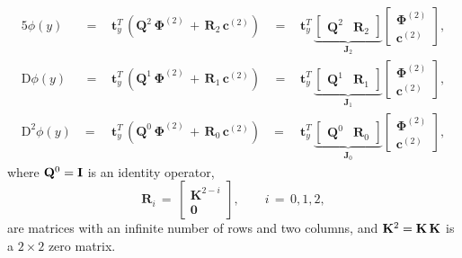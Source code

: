 \documentclass[%
secnumarabic,%
 amssymb, amsmath,%
 aps,prf,superscriptaddress,longbibliography
frontmatterverbose,
]{revtex4-2}
\begin{document}
\begin{alignat}{5}
  \phi(y) 
   &~\,= ~\,& 
   \mathbf t_y^T \, ( \mathbf Q^2 \, \mathbf \Phi^{(2)} \, + \, \mathbf R_2 \, \mathbf c^{(2)} )
   &~\,= ~\,& 	
   \mathbf t_y^T  
   \, 
   \underbrace{\left[\begin{array}{cc} \mathbf Q^2 &  \mathbf R_2 \end{array}\right]}_{\mathbf{J}_2}\left[\begin{array}{c}\boldsymbol \Phi^{(2)} \\ \mathbf c^{(2)}  \end{array}\right],
   \label{eq:rndu}
	\\
	\mathrm D \phi (y) 
  &~\,= ~\,&  
  \mathbf t_y^T \, ( \mathbf Q^1 \, \mathbf \Phi^{(2)} \,+ \, \mathbf R_1 \, \mathbf c^{(2)} )
  &~\,= ~\,& 
  \mathbf t_y^T \, \underbrace{\left[\begin{array}{cc} \mathbf Q^1 &  \mathbf R_1 \end{array}\right]}_{\mathbf J_1}\left[\begin{array}{c}\mathbf \Phi^{(2)} \\ \mathbf c^{(2)}  \end{array}\right],
	\label{eq:rndDu}
	\\
	\mathrm D^2 \phi (y) 
  &\;=\;& 
  \mathbf t_y^T \, ( \mathbf Q^0 \, \mathbf \Phi^{(2)} \,+ \, \mathbf R_0 \, \mathbf c^{(2)} )
  &\; = \;& 
  \mathbf t_y^T \, \underbrace{\left[\begin{array}{cc} \mathbf Q^0 &  \mathbf R_0 \end{array}\right]}_{\mathbf J_0}\left[\begin{array}{c}\mathbf \Phi^{(2)} \\ \mathbf c^{(2)}  \end{array}\right],
	\label{eq:rndD2u}
\end{alignat} 
where $\mathbf{Q}^0 = \mathbf I$ is an identity operator, 
	\[
    \mathbf R_{i} 
    \, = \,
  \left[\begin{array}{c} \mathbf K^{2-i} \\ \mathbf 0\end{array} \right],
    \qquad 
    i \, = \, 0, 1, 2,
	\]
are matrices with an infinite number of rows and two columns, and $\mathbf K^2 = \mathbf K\,\mathbf K$ is a $2 \times 2$ zero matrix. 
\end{document}
